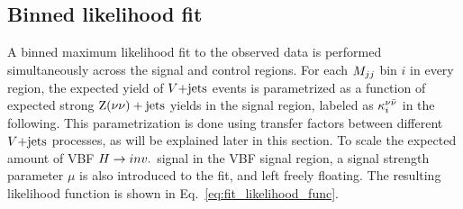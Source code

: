 \subsection{Binned likelihood fit}
\label{subsec:likelihood_fit}

A binned maximum likelihood fit to the observed data is performed simultaneously across the 
signal and control regions. For each $M_{jj}$ bin $i$ in every region, the expected yield of $V\text{+jets}$ events
is parametrized as a function of expected strong $\mathrm{Z}(\nu\nu)+\textrm{jets}$ yields in the signal region, labeled as
$\kappa_{i}^{\nu\bar{\nu}}$ in the following. This parametrization is done using transfer factors between different
$V\text{+jets}$ processes, as will be explained later in this section. To scale the expected amount of VBF
$H \rightarrow inv.$ signal in the VBF signal region, a signal strength parameter $\mu$ is also introduced to
the fit, and left freely floating. The resulting likelihood function is shown in Eq.~\ref{eq:fit_likelihood_func}.


% 
% 


